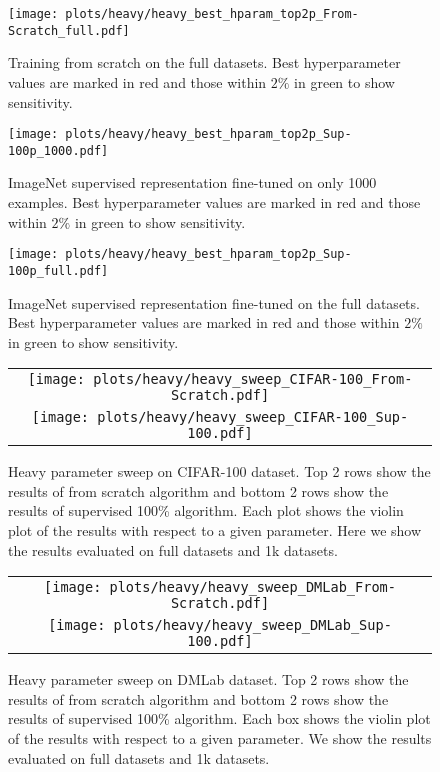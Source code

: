 \documentclass{article}
\newcommand{\imagenet}{ImageNet}
\begin{document}
\begin{figure}[!h]
\centering
\texttt{[image: plots/heavy/heavy\_best\_hparam\_top2p\_From-Scratch\_full.pdf]}
\caption{Training from scratch on the full datasets. Best hyperparameter values are marked in red and those within $2\%$ in green to show sensitivity.}\label{fig:heavy:scratch:full}
\end{figure}

\begin{figure}[!h]
\centering
\texttt{[image: plots/heavy/heavy\_best\_hparam\_top2p\_Sup-100p\_1000.pdf]}
\caption{\imagenet{} supervised representation fine-tuned on only 1000 examples. Best hyperparameter values are marked in red and those within $2\%$ in green to show sensitivity.}\label{fig:heavy:sup:1000}
\end{figure}

\begin{figure}[!h]
\centering
\texttt{[image: plots/heavy/heavy\_best\_hparam\_top2p\_Sup-100p\_full.pdf]}
\caption{\imagenet{} supervised representation fine-tuned on the full datasets. Best hyperparameter values are marked in red and those within $2\%$ in green to show sensitivity.}\label{fig:heavy:sup:full}
\end{figure}


\begin{figure}[H]
\centering
\begin{tabular}{c}
\texttt{[image: plots/heavy/heavy\_sweep\_CIFAR-100\_From-Scratch.pdf]}\\
\texttt{[image: plots/heavy/heavy\_sweep\_CIFAR-100\_Sup-100.pdf]}\\
\end{tabular}
\caption{
Heavy parameter sweep on CIFAR-100 dataset.
Top 2 rows show the results of from scratch algorithm and bottom 2 rows show the results of supervised 100\% algorithm.
Each plot shows the violin plot of the results with respect to a given parameter.
Here we show the results evaluated on full datasets and 1k datasets.
}\label{fig:heavy:cifar100}
\end{figure}

\begin{figure}[H]
\centering
\begin{tabular}{c}
\texttt{[image: plots/heavy/heavy\_sweep\_DMLab\_From-Scratch.pdf]}\\
\texttt{[image: plots/heavy/heavy\_sweep\_DMLab\_Sup-100.pdf]}\\
\end{tabular}
\caption{
Heavy parameter sweep on DMLab dataset.
Top 2 rows show the results of from scratch algorithm and bottom 2 rows show the results of supervised 100\% algorithm.
Each box shows the violin plot of the results with respect to a given parameter.
We show the results evaluated on full datasets and 1k datasets.
}\label{fig:heavy:dmlab}
\end{figure}
\end{document}
